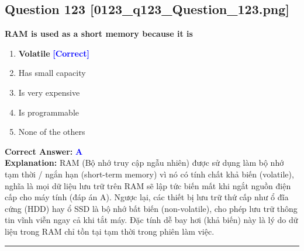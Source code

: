 \documentclass[11pt,a4paper]{article}
\begin{document}
\begin{minipage}{\textwidth}
\subsection*{Question 123 \quad \footnotesize{[0123\_q123\_Question\_123.png]}}
\noindent \textbf{RAM is used as a short memory because it is}

\begin{enumerate}[label=\Alph*.]
    \item \textbf{Volatile} \hfill \textcolor{blue}{\textbf{[Correct]}}
    \item Has small capacity
    \item Is very expensive
    \item Is programmable
    \item None of the others
\end{enumerate}

\noindent \textbf{Correct Answer:} \textcolor{blue}{\textbf{A}} \\[2pt]
\noindent \textbf{Explanation:} RAM (Bộ nhớ truy cập ngẫu nhiên) được sử dụng làm bộ nhớ tạm thời / ngắn hạn (short-term memory) vì nó có tính chất khả biến (volatile), nghĩa là mọi dữ liệu lưu trữ trên RAM sẽ lập tức biến mất khi ngắt nguồn điện cấp cho máy tính (đáp án A). Ngược lại, các thiết bị lưu trữ thứ cấp như ổ đĩa cứng (HDD) hay ổ SSD là bộ nhớ bất biến (non-volatile), cho phép lưu trữ thông tin vĩnh viễn ngay cả khi tắt máy. Đặc tính dễ bay hơi (khả biến) này là lý do dữ liệu trong RAM chỉ tồn tại tạm thời trong phiên làm việc.

\par\vspace{0.3cm}
\hrule
\vspace{0.3cm}
\end{minipage}
\end{document}
